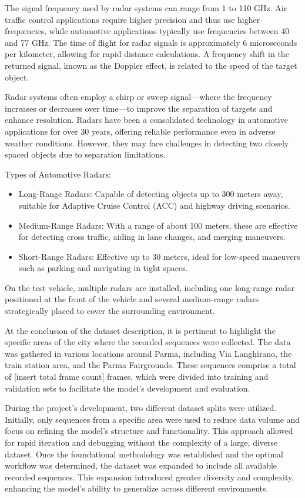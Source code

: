 The signal frequency used by radar systems can range from 1 to 110 GHz. Air traffic control applications require higher precision and thus use higher frequencies, while automotive applications typically use frequencies between 40 and 77 GHz. The time of flight for radar signals is approximately 6 microseconds per kilometer, allowing for rapid distance calculations. A frequency shift in the returned signal, known as the Doppler effect, is related to the speed of the target object.

Radar systems often employ a chirp or sweep signal—where the frequency increases or decreases over time—to improve the separation of targets and enhance resolution. Radars have been a consolidated technology in automotive applications for over 30 years, offering reliable performance even in adverse weather conditions. However, they may face challenges in detecting two closely spaced objects due to separation limitations.

Types of Automotive Radars:
\begin{itemize}
    \item Long-Range Radars: Capable of detecting objects up to 300 meters away, suitable for Adaptive Cruise Control (ACC) and highway driving scenarios.
    \item Medium-Range Radars: With a range of about 100 meters, these are effective for detecting cross traffic, aiding in lane changes, and merging maneuvers.
    \item Short-Range Radars: Effective up to 30 meters, ideal for low-speed maneuvers such as parking and navigating in tight spaces.
\end{itemize}

On the test vehicle, multiple radars are installed, including one long-range radar positioned at the front of the vehicle and several medium-range radars strategically placed to cover the surrounding environment.

At the conclusion of the dataset description, it is pertinent to highlight the specific areas of the city where the recorded sequences were collected. The data was gathered in various locations around Parma, including Via Langhirano, the train station area, and the Parma Fairgrounds. These sequences comprise a total of [insert total frame count] frames, which were divided into training and validation sets to facilitate the model's development and evaluation.

During the project's development, two different dataset splits were utilized. Initially, only sequences from a specific area were used to reduce data volume and focus on refining the model's structure and functionality. This approach allowed for rapid iteration and debugging without the complexity of a large, diverse dataset. Once the foundational methodology was established and the optimal workflow was determined, the dataset was expanded to include all available recorded sequences. This expansion introduced greater diversity and complexity, enhancing the model's ability to generalize across different environments.

